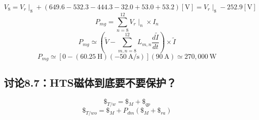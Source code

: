 \begin{equation}%
V_8=V_r\mid_8+(649.6-532.3-444.3-32.0+53.0+53.2)[\mathrm{V}]
=V_r\mid_8-252.9[\mathrm{V}]
\end{equation}
\begin{equation}%
P_{mg}=\sum_{n=8}^{12}V_r\mid_n\times I_n
\end{equation}
\begin{equation}%
P_{mg}\simeq\left(\tilde{V}-\sum_{m,n=8}^{12}L_{m,n}\frac{d\tilde{I}}{dt}\right)\times \tilde{I}
\end{equation}
\begin{equation}%
P_{mg}\simeq[0-(60.25\ \mathrm{H})(-50\ \mathrm{A/s})](90\ \mathrm{A})\simeq 270,000\ \mathrm{W}
\end{equation}




\subsection{讨论8.7：HTS磁体到底要不要保护？}
\begin{equation}%
\$_{T/w}=\$_M+\$_{qp}
\end{equation}
\begin{equation}%
\$_{T/wo}=\$_M+P_{dm}(\$_M+\$_{ra})
\end{equation}